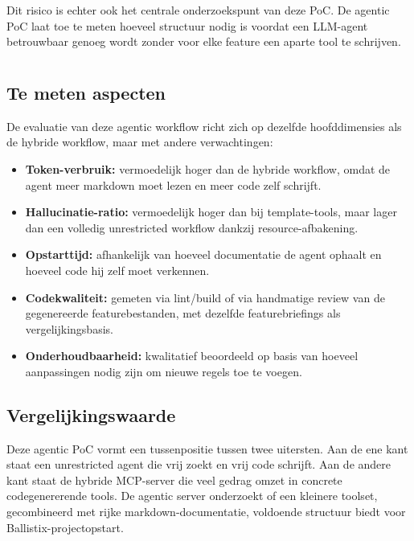 Dit risico is echter ook het centrale onderzoekspunt van deze PoC. De agentic PoC laat toe te meten hoeveel structuur nodig is voordat een LLM-agent betrouwbaar genoeg wordt zonder voor elke feature een aparte tool te schrijven.

\section{}
\label{sec:poc-agentic-evaluatie}

\subsection{Te meten aspecten}

De evaluatie van deze agentic workflow richt zich op dezelfde hoofddimensies als de hybride workflow, maar met andere verwachtingen:

\begin{itemize}
  \item \textbf{Token-verbruik:} vermoedelijk hoger dan de hybride workflow, omdat de agent meer markdown moet lezen en meer code zelf schrijft.
  \item \textbf{Hallucinatie-ratio:} vermoedelijk hoger dan bij template-tools, maar lager dan een volledig unrestricted workflow dankzij resource-afbakening.
  \item \textbf{Opstarttijd:} afhankelijk van hoeveel documentatie de agent ophaalt en hoeveel code hij zelf moet verkennen.
  \item \textbf{Codekwaliteit:} gemeten via lint/build of via handmatige review van de gegenereerde featurebestanden, met dezelfde featurebriefings als vergelijkingsbasis.
  \item \textbf{Onderhoudbaarheid:} kwalitatief beoordeeld op basis van hoeveel aanpassingen nodig zijn om nieuwe regels toe te voegen.
\end{itemize}

\subsection{Vergelijkingswaarde}

Deze agentic PoC vormt een tussenpositie tussen twee uitersten. Aan de ene kant staat een unrestricted agent die vrij zoekt en vrij code schrijft. Aan de andere kant staat de hybride MCP-server die veel gedrag omzet in concrete codegenererende tools. De agentic server onderzoekt of een kleinere toolset, gecombineerd met rijke markdown-documentatie, voldoende structuur biedt voor Ballistix-projectopstart.

